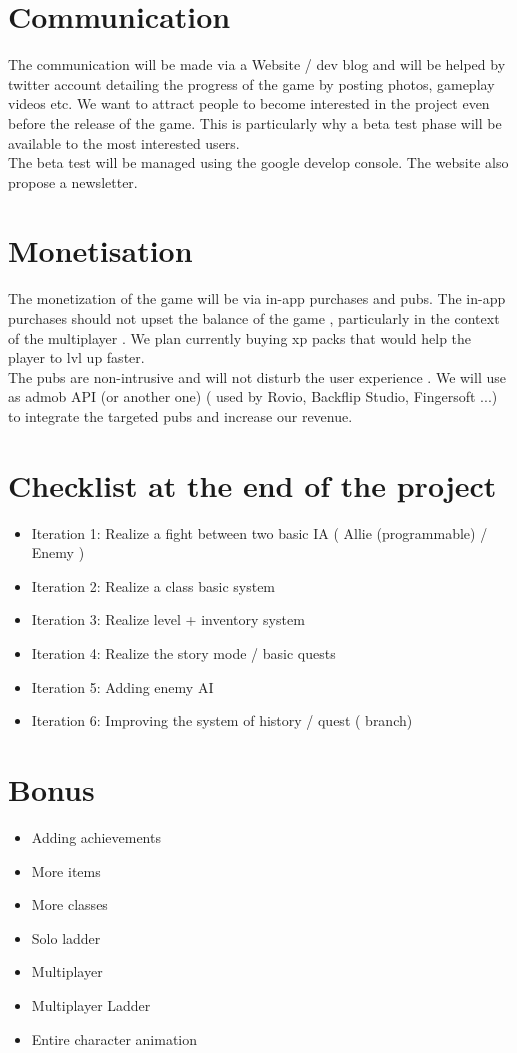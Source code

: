 \documentclass[16pt, oneside]{report}
\begin{document}
\chapter{Communication}
The communication will be made via a Website / dev blog and will be helped by twitter account detailing the progress of the game by posting photos, gameplay videos etc. We want to attract people to become interested in the project even before the release of the game. This is particularly why a beta test phase will be available to the most interested users. \\
 The beta test will be managed using the google develop console. The website also propose a newsletter.

\chapter{Monetisation}
The monetization of the game will be via in-app purchases and pubs.
The in-app purchases should not upset the balance of the game , particularly in the context of the multiplayer . We plan currently buying xp packs that would help the player to lvl up faster. \\
The pubs are non-intrusive and will not disturb the user experience . We will use as admob  API (or another one) ( used by Rovio, Backflip Studio, Fingersoft ...) to integrate the targeted pubs and increase our revenue.

\chapter{Checklist at the end of the project}
\begin{itemize}
	\item Iteration 1: Realize a fight between two basic IA ( Allie (programmable) / Enemy )
	\item Iteration 2: Realize a class basic system
	\item Iteration 3: Realize level + inventory system
	\item Iteration 4: Realize the story mode / basic quests
	\item Iteration 5: Adding enemy AI
	\item Iteration 6: Improving the system of history / quest ( branch)
\end{itemize}

\chapter{Bonus}
\begin{itemize}
	\item	Adding achievements
	\item	More items
	\item	More classes
	\item	Solo ladder
	\item Multiplayer
	\item	 Multiplayer Ladder
	\item	Entire character animation
\end{itemize}
\end{document}
